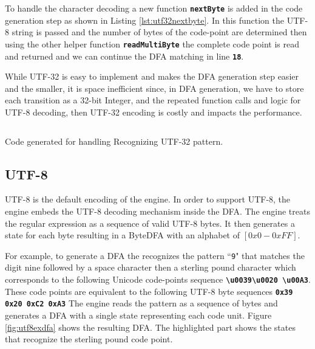 To handle the character decoding a new function \texttt{\textbf{nextByte}} is added in the  code generation step as shown in Listing \ref{lst:utf32nextbyte}. In this function the UTF-8 string is passed and the number of bytes of the code-point are determined then using the other helper function \texttt{\textbf{readMultiByte}} the complete code point is read and returned and we can continue the DFA matching in line \texttt{\textbf{18}}.

While UTF-32 is easy to implement and makes the DFA generation step easier and the smaller, it is space inefficient since, in DFA generation, we have to store each transition as a 32-bit Integer, and the repeated function calls and logic for UTF-8 decoding, then UTF-32 encoding is costly and impacts the performance.
\begin{listing}[htbp]
\inputminted[breaklines=true,frame=lines,linenos]{cpp}{code/utf32.cpp}
\caption[Code generated for handling Recognizing UTF-32 pattern]{Code generated for handling Recognizing UTF-32 pattern.}
\label{lst:utf32nextbyte}
\end{listing}

\subsection{UTF-8}
UTF-8 is the default encoding of the engine. In order to support UTF-8, the engine embeds the UTF-8 decoding mechanism inside the DFA. The engine treats the regular expression as a sequence of valid UTF-8 bytes. It then generates a state for each byte resulting in a ByteDFA with an alphabet of $[0x0 - 0xFF]$.

For example, to generate a DFA the recognizes the pattern ``\texttt{9\textvisiblespace \textsterling}" that matches the digit nine followed by a space character then a sterling pound character which corresponds to the following Unicode code-points sequence \texttt{\textbf{\textbackslash u0039\textbackslash u0020 \textbackslash u00A3}}. These code points are equivalent to the following UTF-8 byte sequences \texttt{\textbf{0x39 0x20 0xC2 0xA3}} The engine reads the pattern as a sequence of bytes and generates a DFA with a single state representing each code unit. Figure \ref{fig:utf8exdfa} shows the resulting DFA. The highlighted part shows the states that recognize the sterling pound code point.

